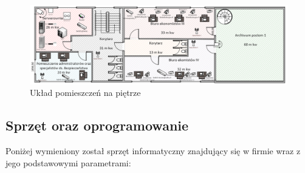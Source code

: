 \begin{landscape}
	\begin{figure}[!h]
		\vspace{3cm}
		\includegraphics[width=24cm]{uklad_pomieszczen_poziom1.png}
		\caption{Układ pomieszczeń na piętrze}
		\label{schemat:uklad_pomieszczen_poziom1}
	\end{figure}
\end{landscape}

\newpage
\subsection{Sprzęt oraz oprogramowanie}
Poniżej wymieniony został sprzęt informatyczny znajdujący się w firmie wraz z jego podstawowymi parametrami:

